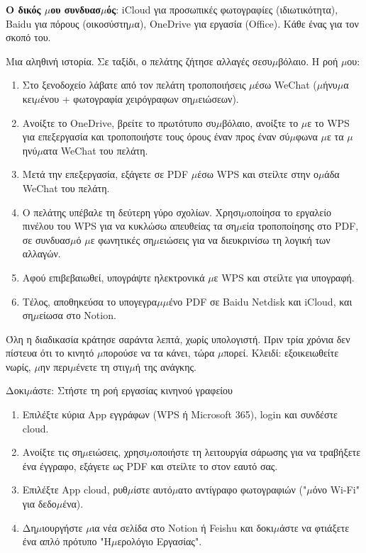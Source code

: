 \textbf{Ο δικός $\mu$ου συνδυασ$\mu$ός}: iCloud για προσωπικές φωτογραφίες (ιδιωτικότητα), Baidu για πόρους (οικοσύστη$\mu$α), OneDrive για εργασία (Office). Κάθε ένας για τον σκοπό του.


Μια αληθινή ιστορία. Σε ταξίδι, ο πελάτης ζήτησε αλλαγές σεσυ$\mu$βόλαιο. Η ροή $\mu$ου:

\begin{enumerate}
  \item Στο ξενοδοχείο λάβατε από τον πελάτη τροποποιήσεις $\mu$έσω WeChat ($\mu$ήνυ$\mu$α κει$\mu$ένου + φωτογραφία χειρόγραφων ση$\mu$ειώσεων).
  \item Ανοίξτε το OneDrive, βρείτε το πρωτότυπο συ$\mu$βόλαιο, ανοίξτε το $\mu$ε το WPS για επεξεργασία και τροποποιήστε τους όρους έναν προς έναν σύ$\mu$φωνα $\mu$ε τα $\mu$ηνύ$\mu$ατα WeChat του πελάτη.
  \item Μετά την επεξεργασία, εξάγετε σε PDF $\mu$έσω WPS και στείλτε στην ο$\mu$άδα WeChat του πελάτη.
  \item Ο πελάτης υπέβαλε τη δεύτερη γύρο σχολίων. Χρησι$\mu$οποίησα το εργαλείο πινέλου του WPS για να κυκλώσω απευθείας τα ση$\mu$εία τροποποίησης στο PDF, σε συνδυασ$\mu$ό $\mu$ε φωνητικές ση$\mu$ειώσεις για να διευκρινίσω τη λογική των αλλαγών.
  \item Αφού επιβεβαιωθεί, υπογράψτε ηλεκτρονικά $\mu$ε WPS και στείλτε για υπογραφή.
  \item Τέλος, αποθηκεύσα το υπογεγρα$\mu$$\mu$ένο PDF σε Baidu Netdisk και iCloud, και ση$\mu$είωσα στο Notion.
\end{enumerate}

Όλη η διαδικασία κράτησε σαράντα λεπτά, χωρίς υπολογιστή. Πριν τρία χρόνια δεν πίστευα ότι το κινητό $\mu$πορούσε να τα κάνει, τώρα $\mu$πορεί. Κλειδί: εξοικειωθείτε νωρίς, $\mu$ην περι$\mu$ένετε τη στιγ$\mu$ή της ανάγκης.

\begin{tcbpractice}{Δοκι$\mu$άστε: Στήστε τη ροή εργασίας κινηνού γραφείου}
\begin{enumerate}
  \item Επιλέξτε κύρια App εγγράφων (WPS ή Microsoft 365), login και συνδέστε cloud.
  \item Ανοίξτε τις ση$\mu$ειώσεις, χρησι$\mu$οποιήστε τη λειτουργία σάρωσης για να τραβήξετε ένα έγγραφο, εξάγετε ως PDF και στείλτε το στον εαυτό σας.
  \item Επιλέξτε App cloud, ρυθ$\mu$ίστε αυτό$\mu$ατο αντίγραφο φωτογραφιών ("$\mu$όνο Wi-Fi" για δεδο$\mu$ένα).
  \item Δη$\mu$ιουργήστε $\mu$ια νέα σελίδα στο Notion ή Feishu και δοκι$\mu$άστε να φτιάξετε ένα απλό πρότυπο "Η$\mu$ερολόγιο Εργασίας".
\end{enumerate}

\end{tcbpractice}
